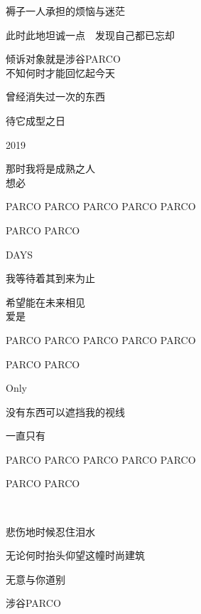 褥子一人承担的烦恼与迷茫

此时此地坦诚一点　发现自己都已忘却

倾诉对象就是涉谷PARCO
\\

不知何时才能回忆起今天

曾经消失过一次的东西

待它成型之日

2019

那时我将是成熟之人
\\

想必

PARCO PARCO PARCO PARCO PARCO

PARCO PARCO

DAYS

我等待着其到来为止

希望能在未来相见
\\

爱是

PARCO PARCO PARCO PARCO PARCO

PARCO PARCO

Only

没有东西可以遮挡我的视线

一直只有

PARCO PARCO PARCO PARCO PARCO

PARCO PARCO


悲伤地时候忍住泪水

无论何时抬头仰望这幢时尚建筑

无意与你道别

涉谷PARCO
\\
